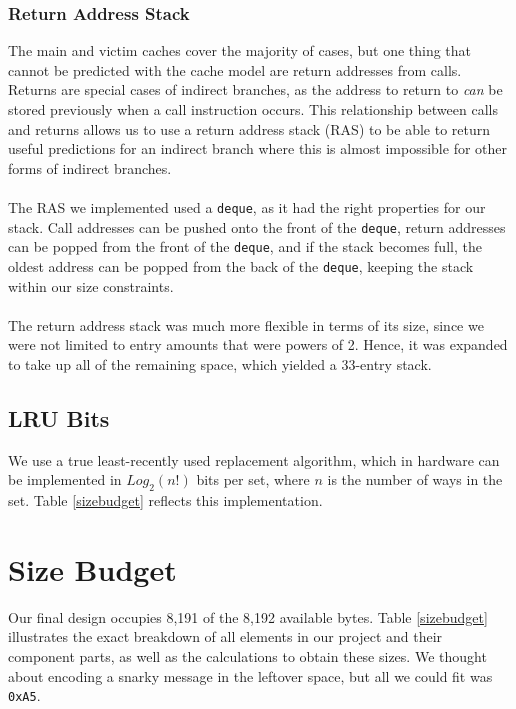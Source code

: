 \documentclass[twocolumn]{article}
\begin{document}
\subsubsection{Return Address Stack}
The main and victim caches cover the majority of cases, but one thing that cannot be predicted with the cache model are return addresses from calls. Returns are special cases of indirect branches, as the address to return to {\it can} be stored previously when a call instruction occurs. This relationship between calls and returns allows us to use a return address stack (RAS) to be able to return useful predictions for an indirect branch where this is almost impossible for other forms of indirect branches.\\\\ 
The RAS we implemented used a \texttt{deque}, as it had the right properties for our stack. Call addresses can be pushed onto the front of the \texttt{deque}, return addresses can be popped from the front of the \texttt{deque}, and if the stack becomes full, the oldest address can be popped from the back of the \texttt{deque}, keeping the stack within our size constraints.\\\\
The return address stack was much more flexible in terms of its size, since we were not limited to entry amounts that were powers of 2.  Hence, it was expanded to take up all of the remaining space, which yielded a 33-entry stack.
\subsection{LRU Bits}
We use a true least-recently used replacement algorithm, which in hardware can be implemented in $Log_2(n!)$ bits per set, where $n$ is the number of ways in the set.  Table \ref{sizebudget} reflects this implementation.
\section{Size Budget}
Our final design occupies 8,191 of the 8,192 available bytes. Table \ref{sizebudget} illustrates the exact breakdown of all elements in our project and their component parts, as well as the calculations to obtain these sizes.  We thought about encoding a snarky message in the leftover space, but all we could fit was \texttt{0xA5}.
\end{document}
